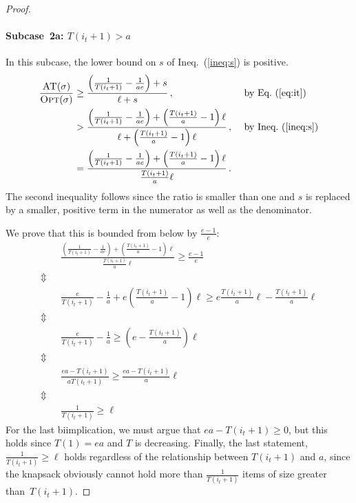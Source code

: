 \documentclass[a4paper,UKenglish,cleveref, autoref, thm-restate]{lipics-v2021}
\newcommand{\OPT}{\ensuremath{\operatorname{\textsc{Opt}}}\xspace}
\newcommand{\ADB}{\ensuremath{\operatorname{\textsc{AT}}}\xspace}
\newcommand{\TF}{T}
\begin{document}
\begin{proof}
\paragraph*{Subcase~2a: $\TF(i_t+1) > a$}
In this subcase, the lower bound on $s$ of Ineq.~(\ref{ineq:s}) is positive.
\begin{alignat*}{2}
  \frac{\ADB(\sigma)}{\OPT(\sigma)}
  & \geq 
  \frac{\left(\frac{1}{\TF(i_t+1)}-\frac{1}{ae}\right) + s}{\ell+s}\,, &&
  \text{ by Eq.~(\ref{eq:it})} \\
  & > 
  \frac{\left(\frac{1}{\TF(i_t+1)}-\frac{1}{ae}\right) +
    \left(\frac{\TF(i_t+1)}{a}-1\right)\ell}{\ell+\left(\frac{\TF(i_t+1)}{a}-1\right)\ell}\,, &&
  \text{ by Ineq.~(\ref{ineq:s})}\\
  & = 
  \frac{\left(\frac{1}{\TF(i_t+1)}-\frac{1}{ae}\right) + \left(\frac{\TF(i_t+1)}{a}-1\right)\ell}{\frac{\TF(i_t+1)}{a}\ell}\,.
  \end{alignat*}
The second inequality follows since the ratio is smaller than one and $s$ is
replaced by a smaller, positive term in the numerator as well as the
denominator.
  
We prove that this is bounded from below by $\frac{e-1}{e}$:
\begin{align*}
& \frac{\left(\frac{1}{\TF(i_t+1)}-\frac{1}{ae}\right) + \left(\frac{\TF(i_t+1)}{a}-1\right)\ell}{\frac{\TF(i_t+1)}{a}\ell}
  \geq \frac{e-1}{e} \\
\Updownarrow~~~ \\
& \frac{e}{\TF(i_t+1)} - \frac{1}{a} + e\left(\frac{\TF(i_t+1)}{a}-1\right)\ell
  \geq e\frac{\TF(i_t+1)}{a}\ell - \frac{\TF(i_t+1)}{a}\ell \\
\Updownarrow~~~ \\
& \frac{e}{\TF(i_t+1)} - \frac{1}{a}
  \geq  \left(e - \frac{\TF(i_t+1)}{a}\right)\ell \\
\Updownarrow~~~ \\
& \frac{ea-\TF(i_t+1)}{a\TF(i_t+1)}
  \geq \frac{ea-\TF(i_t+1)}{a}\ell \\
\Updownarrow~~~ \\
& \frac{1}{\TF(i_t+1)} \geq \ell
\end{align*}
For the last biimplication, we must argue that $ea-\TF(i_t+1) \geq 0$,
but this holds since $\TF(1)=ea$ and $\TF$ is decreasing.
Finally, the last statement, $\frac{1}{\TF(i_t+1)} \geq \ell$ holds
regardless of the relationship between $\TF(i_t+1)$ and $a$, since the
knapsack obviously cannot hold more than $\frac{1}{\TF(i_t+1)}$ items of
size greater than~$\TF(i_t+1)$.



\end{proof}
\end{document}
